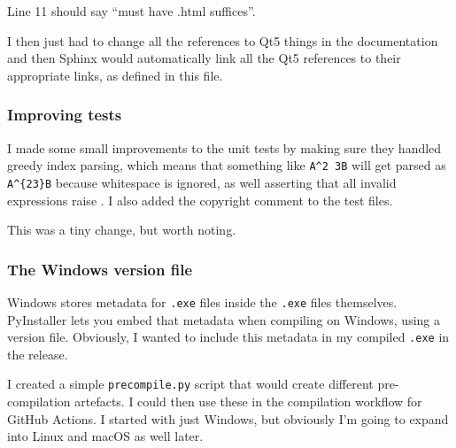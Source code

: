 \documentclass[../development.tex]{subfiles}
\begin{document}

Line 11 should say \enquote{must have .html suffices}.


I then just had to change all the references to Qt5 things in the documentation and then Sphinx would automatically link all the Qt5 references to their appropriate links, as defined in this file.

\subsubsection{Improving tests\label{development:preparing-for-v0.2.1:improving-tests}}

I made some small improvements to the unit tests by making sure they handled greedy index parsing, which means that something like \texttt{A\textasciicircum2 3B} will get parsed as \texttt{A\textasciicircum\{23\}B} because whitespace is ignored, as well asserting that all invalid expressions raise . I also added the copyright comment to the test files.

This was a tiny change, but worth noting.




\subsubsection{The Windows version file\label{development:preparing-for-v0.2.1:the-windows-version-file}}

Windows stores metadata for \texttt{.exe} files inside the \texttt{.exe} files themselves\cite{msdocs-version-information-structures}\cite{msdocs-versioninfo-resource}. PyInstaller lets you embed that metadata when compiling on Windows, using a version file\cite{pyintaller-4.10-capturing-windows-version-data}. Obviously, I wanted to include this metadata in my compiled \texttt{.exe} in the release.

I created a simple \texttt{precompile.py} script that would create different pre-compilation artefacts. I could then use these in the compilation workflow for GitHub Actions. I started with just Windows, but obviously I'm going to expand into Linux and macOS as well later.
\end{document}
